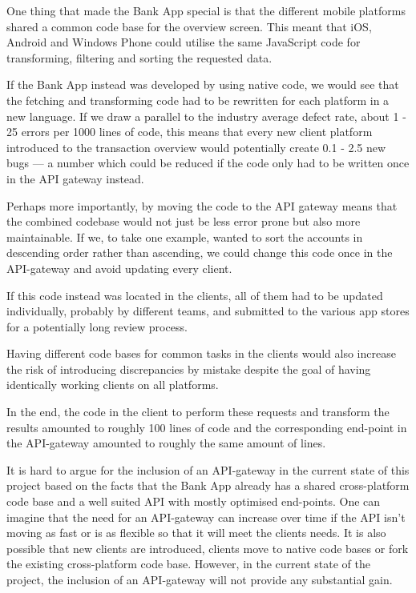 \documentclass{cslthse-msc}
\begin{document}
One thing that made the Bank App special is that the different mobile platforms shared a common code base for the overview screen. This meant that iOS, Android and Windows Phone could utilise the same JavaScript code for transforming, filtering and sorting the requested data.

If the Bank App instead was developed by using native code, we would see that the fetching and transforming code had to be rewritten for each platform in a new language. If we draw a parallel to the industry average defect rate, about 1 - 25 errors per 1000 lines of code\cite{code_complete}, this means that every new client platform introduced to the transaction overview would potentially create 0.1 - 2.5 new bugs --- a number which could be reduced if the code only had to be written once in the API gateway instead.

Perhaps more importantly, by moving the code to the API gateway means that the combined codebase would not just be less error prone but also more maintainable. If we, to take one example, wanted to sort the accounts in descending order rather than ascending, we could change this code once in the API-gateway and avoid updating every client. 

If this code instead was located in the clients, all of them had to be updated individually, probably by different teams, and submitted to the various app stores for a potentially long review process.

Having different code bases for common tasks in the clients would also increase the risk of introducing discrepancies by mistake despite the goal of having identically working clients on all platforms.

In the end, the code in the client to perform these requests and transform the results amounted to roughly 100 lines of code and the corresponding end-point in the API-gateway amounted to roughly the same amount of lines.

It is hard to argue for the inclusion of an API-gateway in the current state of this project based on the facts that the Bank App already has a shared cross-platform code base and a well suited API with mostly optimised end-points. One can imagine that the need for an API-gateway can increase over time if the API isn't moving as fast or is as flexible so that it will meet the clients needs. It is also possible that new clients are introduced, clients move to native code bases or fork the existing cross-platform code base. However, in the current state of the project, the inclusion of an API-gateway will not provide any substantial gain.
\end{document}

